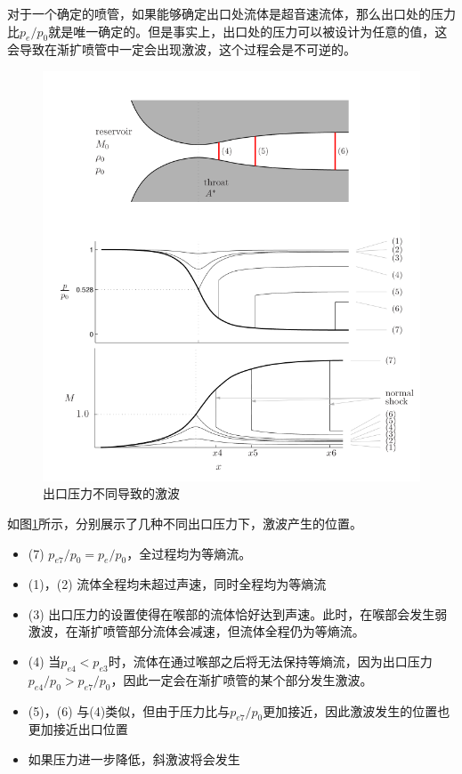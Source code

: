 对于一个确定的喷管，如果能够确定出口处流体是超音速流体，那么出口处的压力比$p_e/p_0$就是唯一确定的。但是事实上，出口处的压力可以被设计为任意的值，这会导致在渐扩喷管中一定会出现激波，这个过程会是不可逆的。

\begin{figure}[!ht]
    \centering
    \includegraphics[width=\linewidth]{figures/3.png}
    \caption{出口压力不同导致的激波}
    \label{3}
\end{figure}

如图\ref{3}所示，分别展示了几种不同出口压力下，激波产生的位置。

\begin{itemize}
    \item (7) $p_{e7}/p_0=p_e/p_0$，全过程均为等熵流。
    \item (1)，(2) 流体全程均未超过声速，同时全程均为等熵流
    \item (3) 出口压力的设置使得在喉部的流体恰好达到声速。此时，在喉部会发生弱激波，在渐扩喷管部分流体会减速，但流体全程仍为等熵流。
    \item (4) 当$p_{e4}<p_{e3}$时，流体在通过喉部之后将无法保持等熵流，因为出口压力$p_{e4}/p_0>p_{e7}/p_0$，因此一定会在渐扩喷管的某个部分发生激波。
    \item (5)，(6) 与(4)类似，但由于压力比与$p_{e7}/p_0$更加接近，因此激波发生的位置也更加接近出口位置
    \item 如果压力进一步降低，斜激波将会发生
\end{itemize}

